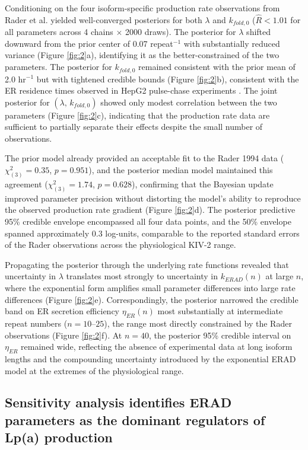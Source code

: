 \documentclass[12pt,letterpaper]{article}
\begin{document}
Conditioning on the four isoform-specific production rate observations from Rader et al.  \citep{rader1994inverse} yielded well-converged posteriors for both $\lambda$ and  $k_{fold,0}$ ($\hat{R} < 1.01$ for all parameters across 4 chains $\times$ 2000 draws).  The posterior for $\lambda$ shifted downward from the prior center of 0.07 repeat$^{-1}$  with substantially reduced variance (Figure \ref{fig:2}a), identifying it as the  better-constrained of the two parameters. The posterior for $k_{fold,0}$ remained  consistent with the prior mean of 2.0 hr$^{-1}$ but with tightened credible bounds  (Figure \ref{fig:2}b), consistent with the ER residence times observed in HepG2  pulse-chase experiments \citep{white1994molecular}. The joint posterior for $(\lambda,\,  k_{fold,0})$ showed only modest correlation between the two parameters (Figure  \ref{fig:2}c), indicating that the production rate data are sufficient to partially  separate their effects despite the small number of observations.

The prior model already provided an acceptable fit to the Rader 1994 data  ($\chi^2_{(3)} = 0.35$, $p = 0.951$), and the posterior median model maintained this agreement ($\chi^2_{(3)} = 1.74$, $p = 0.628$), confirming that the Bayesian update improved parameter precision without distorting the model's ability to reproduce the  observed production rate gradient (Figure \ref{fig:2}d). The posterior predictive 95\%  credible envelope encompassed all four data points, and the 50\% envelope spanned approximately 0.3 log-units, comparable to the reported standard errors of the Rader observations across the physiological KIV-2 range.

Propagating the posterior through the underlying rate functions revealed that uncertainty  in $\lambda$ translates most strongly to uncertainty in $k_{ERAD}(n)$ at large $n$, where  the exponential form amplifies small parameter differences into large rate differences  (Figure \ref{fig:2}e). Correspondingly, the posterior narrowed the credible band on ER  secretion efficiency $\eta_{ER}(n)$ most substantially at intermediate repeat numbers  ($n = 10$--$25$), the range most directly constrained by the Rader observations (Figure  \ref{fig:2}f). At $n = 40$, the posterior 95\% credible interval on $\eta_{ER}$ remained  wide, reflecting the absence of experimental data at long isoform lengths and the  compounding uncertainty introduced by the exponential ERAD model at the extremes of the  physiological range.

\subsection{Sensitivity analysis identifies ERAD parameters as the dominant regulators of Lp(a) production}
\end{document}
